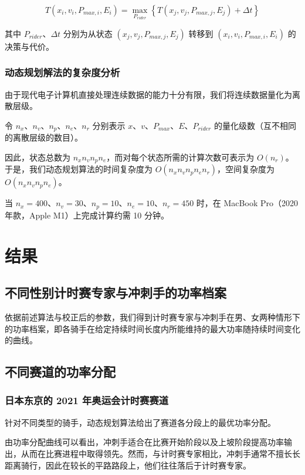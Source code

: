 \documentclass[11pt,a4paper]{ctexart}
\begin{document}
\begin{equation}
T(x_i,v_i,P_{max,i},E_i)=\max_{P_{rider}}\left\{T(x_j,v_j,P_{max,j},E_j)+\Delta t\right\}
\end{equation}

其中 $P_{rider}$、$\Delta t$ 分别为从状态 $(x_j,v_j,P_{max,j},E_j)$ 转移到 $(x_i,v_i,P_{max,i},E_i)$ 的决策与代价。

\subsubsection{动态规划解法的复杂度分析}

由于现代电子计算机直接处理连续数据的能力十分有限，我们将连续数据量化为离散层级。

令 $n_x$、$n_v$、$n_p$、$n_e$、$n_r$ 分别表示 $x$、$v$、$P_{max}$、$E$、$P_{rider}$ 的量化级数（互不相同的离散层级的数目）。

因此，状态总数为 $n_x n_v n_p n_e$，而对每个状态所需的计算次数可表示为 $O(n_r)$。于是，我们动态规划算法的时间复杂度为 $O(n_x n_v n_p n_e n_r)$，空间复杂度为 $O(n_x n_v n_p n_e)$。

当 $n_x=400$、$n_v=30$、$n_p=10$、$n_e=10$、$n_r=450$ 时，在 MacBook Pro（2020 年款，Apple M1）上完成计算约需 10 分钟。
\section{结果}

\subsection{不同性别计时赛专家与冲刺手的功率档案}

依据前述算法与校正后的参数，我们得到计时赛专家与冲刺手在男、女两种情形下的功率档案，即各骑手在给定持续时间长度内所能维持的最大功率随持续时间变化的曲线。

\subsection{不同赛道的功率分配}

\subsubsection{日本东京的 2021 年奥运会计时赛赛道}

针对不同类型的骑手，动态规划算法给出了赛道各分段上的最优功率分配。

由功率分配曲线可以看出，冲刺手适合在比赛开始阶段以及上坡阶段提高功率输出，从而在比赛进程中取得领先。然而，与计时赛专家相比，冲刺手通常不擅长长距离骑行，因此在较长的平路路段上，他们往往落后于计时赛专家。
\end{document}
